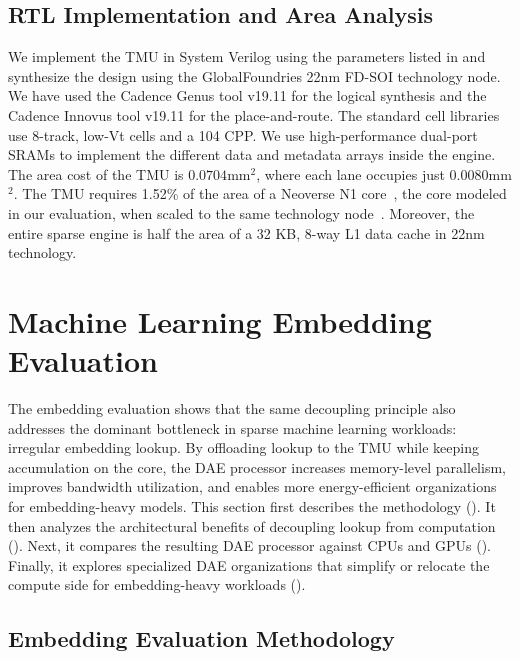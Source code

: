 \subsection{RTL Implementation and Area Analysis} \label{sec:tmu-rtl-area-analysis} %
We implement the TMU in System Verilog using the parameters listed in  and synthesize the design using the GlobalFoundries 22nm FD-SOI technology node. We have used the Cadence Genus tool v19.11 for the logical synthesis and the Cadence Innovus tool v19.11 for the place-and-route.
The standard cell libraries use 8-track, low-Vt cells and a 104 CPP. We use high-performance dual-port SRAMs to implement the different data and metadata arrays inside the engine.
The area cost of the TMU is $0.0704$mm$^2$, where each lane occupies just $0.0080$mm$^2$. The TMU requires 1.52\% of the area of a Neoverse N1 core~\cite{pellegrini2020arm}, the core modeled in our evaluation, when scaled to the same technology node~\cite{stillmaker2017scaling}.
Moreover, the entire sparse engine is half the area of a 32 KB, 8-way L1 data cache in 22nm technology.

\section{Machine Learning Embedding Evaluation} \label{sec:tmu-embedding-evaluation} %

The embedding evaluation shows that the same decoupling principle also addresses the dominant bottleneck in sparse machine learning workloads: irregular embedding lookup. By offloading lookup to the TMU while keeping accumulation on the core, the DAE processor increases memory-level parallelism, improves bandwidth utilization, and enables more energy-efficient organizations for embedding-heavy models. This section first describes the methodology (). It then analyzes the architectural benefits of decoupling lookup from computation (). Next, it compares the resulting DAE processor against CPUs and GPUs (). Finally, it explores specialized DAE organizations that simplify or relocate the compute side for embedding-heavy workloads ().

\subsection{Embedding Evaluation Methodology} \label{sec:tmu-embedding-methodology} %

